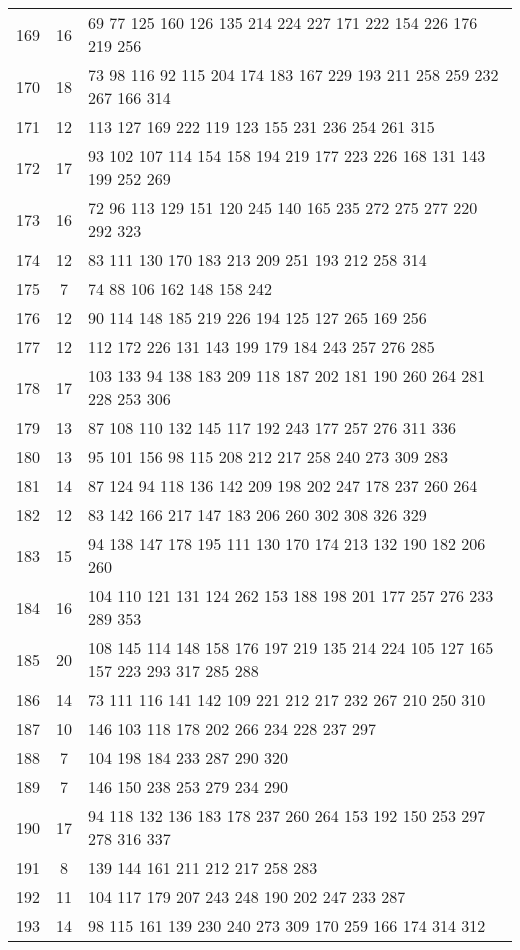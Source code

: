 \documentclass{standalone}
\begin{document}
\begin{tabular}{c c l}
169 & 16 & 69 77 125 160 126 135 214 224 227 171 222 154 226 176 219 256 \\
170 & 18 & 73 98 116 92 115 204 174 183 167 229 193 211 258 259 232 267 166 314 \\
171 & 12 & 113 127 169 222 119 123 155 231 236 254 261 315 \\
172 & 17 & 93 102 107 114 154 158 194 219 177 223 226 168 131 143 199 252 269 \\
173 & 16 & 72 96 113 129 151 120 245 140 165 235 272 275 277 220 292 323 \\
174 & 12 & 83 111 130 170 183 213 209 251 193 212 258 314 \\
175 & 7 & 74 88 106 162 148 158 242 \\
176 & 12 & 90 114 148 185 219 226 194 125 127 265 169 256 \\
177 & 12 & 112 172 226 131 143 199 179 184 243 257 276 285 \\
178 & 17 & 103 133 94 138 183 209 118 187 202 181 190 260 264 281 228 253 306 \\
179 & 13 & 87 108 110 132 145 117 192 243 177 257 276 311 336 \\
180 & 13 & 95 101 156 98 115 208 212 217 258 240 273 309 283 \\
181 & 14 & 87 124 94 118 136 142 209 198 202 247 178 237 260 264 \\
182 & 12 & 83 142 166 217 147 183 206 260 302 308 326 329 \\
183 & 15 & 94 138 147 178 195 111 130 170 174 213 132 190 182 206 260 \\
184 & 16 & 104 110 121 131 124 262 153 188 198 201 177 257 276 233 289 353 \\
185 & 20 & 108 145 114 148 158 176 197 219 135 214 224 105 127 165 157 223 293 317 285 288 \\
186 & 14 & 73 111 116 141 142 109 221 212 217 232 267 210 250 310 \\
187 & 10 & 146 103 118 178 202 266 234 228 237 297 \\
188 & 7 & 104 198 184 233 287 290 320 \\
189 & 7 & 146 150 238 253 279 234 290 \\
190 & 17 & 94 118 132 136 183 178 237 260 264 153 192 150 253 297 278 316 337 \\
191 & 8 & 139 144 161 211 212 217 258 283 \\
192 & 11 & 104 117 179 207 243 248 190 202 247 233 287 \\
193 & 14 & 98 115 161 139 230 240 273 309 170 259 166 174 314 312 \\

\end{tabular}
\end{document}
